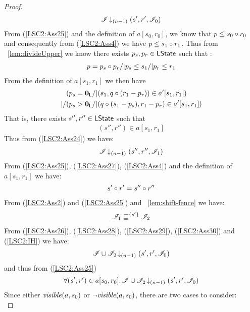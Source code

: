 \begin{lemma}
\begin{proof}
%
\begin{align}
	\mathscr{I} \!\downarrow_{(n-1)} \left(s', r', \mathscr{I}_0\right)
	\label{LSC2:Ass26}
\end{align}
From (\ref{LSC2:Ass25}) and the definition of $a[s_0, r_0]$, we know that $p \leq s_0 \circ r_0$ and consequently from (\ref{LSC2:Ass4}) we have $p \leq s_1 \circ r_1$. Thus from \lem~\ref{lem:divideUpper} we know there exists $p_s, p_r \in \textsf{LState}$ such that : 
%
\begin{align*}
	p = p_s \circ p_r /| p_s \leq s_1 /| p_r \leq r_1
\end{align*}
%
From the definition of $a[s_1, r_1]$ we then have
%
\begin{align*}
	& (p_s = \mathbf{0}_{\textsf{L}} /| (s_1, q \circ (r_1 -p_r)) \in a'[s_1, r_1])\\
	|/ & (p_s > \mathbf{0}_{\textsf{L}} /| (q \circ (s_1 - p_s), r_1 - p_r) \in a'[s_1, r_1]) 
\end{align*}
That is, there exists $s'', r'' \in \textsf{LState}$ such that
%
\begin{align}
	(s'', r'') \in a[s_1, r_1]
	\label{LSC2:Ass27}
\end{align}
%
Thus from (\ref{LSC2:Ass24}) we have:
%
\begin{align}
	\mathscr{I} \!\downarrow_{(n-1)} \left(s'', r'', \mathscr{I}_1\right)
	\label{LSC2:Ass28}
\end{align}
%
From (\ref{LSC2:Ass25}), (\ref{LSC2:Ass27}), (\ref{LSC2:Ass4}) and the definition of $a[s_1, r_1]$ we have:
%
\begin{align}
	s' \circ r' = s'' \circ r'' 
	\label{LSC2:Ass29}
\end{align}
%
From (\ref{LSC2:Ass2}) and (\ref{LSC2:Ass25}) and \lem~\ref{lem:shift-fence} we have:
%
\begin{align}
	\mathscr{I}_1 \sqsubseteq^{\{s'\}} \mathscr{I}_2 
	\label{LSC2:Ass30}
\end{align}
%
From (\ref{LSC2:Ass26}), (\ref{LSC2:Ass28}), (\ref{LSC2:Ass29}), (\ref{LSC2:Ass30}) and (\ref{LSC2:IH}) we have: 
%
\begin{align*}
	\mathscr{I} \cup \mathscr{I}_2 \!\downarrow_{(n-1)} \left(s', r', \mathscr{I}_0\right)
\end{align*}
%
and thus from (\ref{LSC2:Ass25}) 
%
\begin{align}
	\forall (s', r') \in a[s_0, r_0].\, \mathscr{I} \cup \mathscr{I}_2 \!\downarrow_{(n-1)} \left(s', r', \mathscr{I}_0\right)
	\label{LSC2:Ass31}
\end{align}
%
Since either $\mathit{visible}(a, s_0)$ or $\neg\mathit{visible}(a, s_0)$, there are two cases to consider:\\


\end{proof}
\end{lemma}
